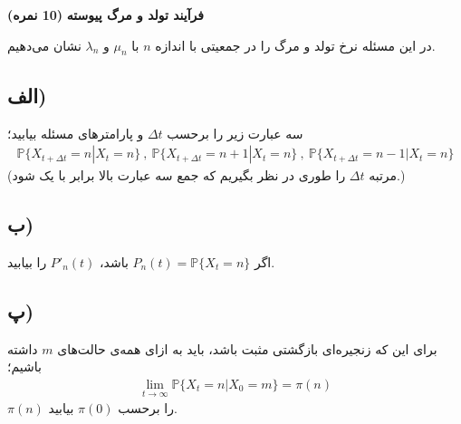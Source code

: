 \Large \textbf{فرآیند تولد و مرگ پیوسته}
\large \textbf{(10 نمره)}

\normalsize \vspace{0.5cm}

در این مسئله نرخ تولد و مرگ را در جمعیتی با اندازه 
$n$ با 
$\mu_n$ و $\lambda_n$ نشان می‌دهیم.
\subsection*{الف)}
سه عبارت زیر را برحسب 
$\Delta t$ و پارامترهای مسئله بیابید؛
\begin{align*}
    \mathbb{P}\{ X_{t+\Delta t}=n|X_t=n\}\ , \ \mathbb{P}\{ X_{t+\Delta t}=n+1|X_t=n\}\ , \ \mathbb{P}\{ X_{t+\Delta t}=n-1|X_t=n\}
\end{align*}
 (مرتبه 
 $\Delta t$ را طوری در نظر بگیریم که جمع سه عبارت بالا برابر با یک شود.)

\subsection*{ب)}
اگر 
$P_n(t)=\mathbb{P}\{X_t=n\}$ باشد، 
$P'_n(t)$ را بیابید.
\subsection*{پ)}
برای این که زنجیره‌ای بازگشتی مثبت باشد، باید به ازای همه‌ی حالت‌های 
$m$
داشته باشیم؛
\begin{align*}
    \lim_{t\rightarrow \infty}\mathbb{P}\{X_t=n|X_0=m\}=\pi(n)
\end{align*}
$\pi(n)$ را برحسب 
$\pi(0)$ بیابید.
